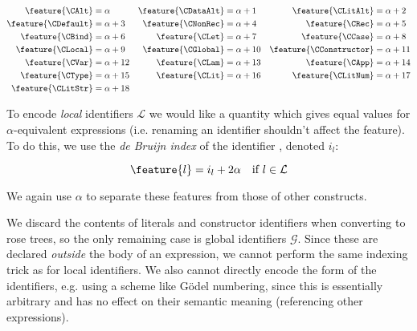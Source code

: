 \begin{equation} \label{eq:feature}
  \begin{aligned}
    \feature{\CAlt}          &= \alpha      &
    \feature{\CDataAlt}      &= \alpha + 1  &
    \feature{\CLitAlt}       &= \alpha + 2  \\
    \feature{\CDefault}      &= \alpha + 3  &
    \feature{\CNonRec}       &= \alpha + 4  &
    \feature{\CRec}          &= \alpha + 5  \\
    \feature{\CBind}         &= \alpha + 6  &
    \feature{\CLet}          &= \alpha + 7  &
    \feature{\CCase}         &= \alpha + 8  \\
    \feature{\CLocal}        &= \alpha + 9  &
    \feature{\CGlobal}       &= \alpha + 10 &
    \feature{\CConstructor}  &= \alpha + 11 \\
    \feature{\CVar}          &= \alpha + 12 &
    \feature{\CLam}          &= \alpha + 13 &
    \feature{\CApp}          &= \alpha + 14 \\
    \feature{\CType}         &= \alpha + 15 &
    \feature{\CLit}          &= \alpha + 16 &
    \feature{\CLitNum}       &= \alpha + 17 \\
    \feature{\CLitStr}       &= \alpha + 18
  \end{aligned}
\end{equation}

To encode \emph{local} identifiers $\mathcal{L}$ we would like a quantity which
gives equal values for $\alpha$-equivalent expressions (i.e. renaming an
identifier shouldn't affect the feature). To do this, we use the \emph{de Bruijn
  index} of the identifier \cite{de1972lambda}, denoted $i_l$:

\begin{equation} \label{eq:localfeature}
  \feature{l} = i_l + 2 \alpha \quad \text{if $l \in \mathcal{L}$}
\end{equation}

We again use $\alpha$ to separate these features from those of other constructs.

We discard the contents of literals and constructor identifiers when converting
to rose trees, so the only remaining case is global identifiers
$\mathcal{G}$. Since these are declared \emph{outside} the body of an
expression, we cannot perform the same indexing trick as for local
identifiers. We also cannot directly encode the form of the identifiers,
e.g. using a scheme like G{\"o}del numbering, since this is essentially
arbitrary and has no effect on their semantic meaning (referencing other
expressions).


